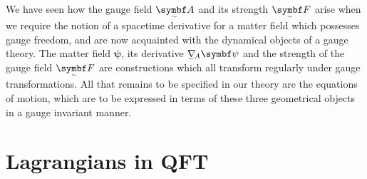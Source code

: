 
We have seen how the gauge field $\tsbm A$ and its strength $\tsbm F$ arise when we require the notion of a spacetime derivative for a matter field which possesses gauge freedom, and are now acquainted with the dynamical objects of a gauge theory.
The matter field $\bm\psi$, its derivative $\ts\nabla_{\!A}\bm\psi$ and the strength of the gauge field $\tsbm F$ are constructions which all transform regularly under gauge transformations.
All that remains to be specified in our theory are the equations of motion, which are to be expressed in terms of these three geometrical objects in a gauge invariant manner.









\section{Lagrangians in QFT}
\label{sec:Lagrangians}


